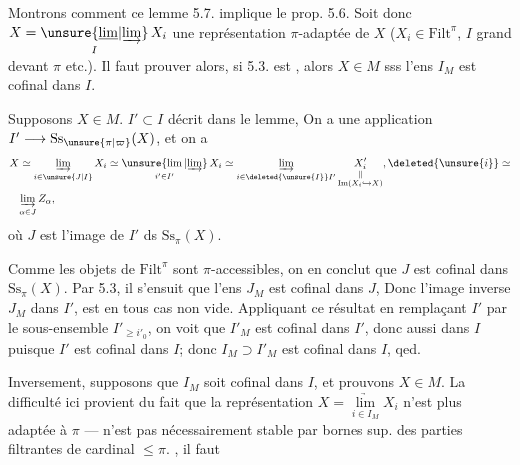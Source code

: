 Montrons comment ce lemme 5.7.
implique le  prop. 5.6.  Soit donc
$X=\underset{I}{\unsure{\underline{\mathrm{lim}}|\underrightarrow{\mathrm{lim}}}}\,X_i$ une représentation $\pi$-adaptée
de $X$ ($X_i\in\mathrm{Filt}^{\pi}$, $I$ grand devant $\pi$
etc.). Il faut prouver alors,  si
5.3. est , alors $X\in M$ sss l'ens
$I_M$ est cofinal dans $I$.


Supposons $X\in M$.  
$I'\subset I$  décrit dans le lemme, On a une application
$I'\longrightarrow\mathrm{Ss}_{\unsure{\pi|\varpi}}(X)$,  et on a
\[
\begin{aligned}
 X &\simeq\underset{i\in\unsure{J|I}}{\underrightarrow{\lim}}\,X_i
 \simeq\underset{i'\in I'}{\unsure{\lim|\underrightarrow{\lim}}}\,X_i
 \simeq\underset{i\in\deleted{\unsure{I}}I'}{\underrightarrow{\lim}}\,
 \underset{\substack{\Vert\\ \mathrm{Im}(X_i\hookrightarrow X)}}{X'_i},
 \deleted{\unsure{i}}\simeq\\
 &\underset{\alpha\in J}{\underrightarrow{\lim}}\,Z_\alpha ,
\end{aligned}
\]
où $J$ est l'image de $I'$ ds $\mathrm{Ss}_\pi(X)$.

 Comme les objets de $\mathrm{Filt}^{\pi}$ sont $\pi$-accessibles, on en conclut que $J$ est cofinal dans $\mathrm{Ss}_{\pi}(X)$. Par 5.3, il s'ensuit que l'ens $J_M$ 
est cofinal dans $J$,  Donc  l'image inverse  $J_M$ dans $I'$, est en tous cas non vide.
Appliquant  ce \unsure{$=$|--}résultat en remplaçant $I'$ par le sous-ensemble $I'_{\geq i'_0}$, on voit que $I'_M$ est cofinal dans $I'$, donc aussi dans $I$ puisque $I'$ est cofinal dans $I$; donc $I_M\supset I'_M$ est cofinal dans $I$, qed.

Inversement,  supposons que $I_M$ soit cofinal dans $I$, et prouvons $X\in M$. La difficulté ici provient du fait que la représentation $X=\underset{i\in I_M}{\underrightarrow{\lim}}X_i$ n'est plus adaptée à $\pi$ ---   n'est pas nécessairement stable  par bornes sup.  des parties filtrantes   de cardinal $\leq\pi$. , il faut

